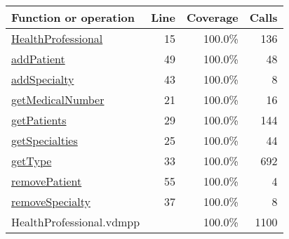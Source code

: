 \bigskip
\begin{longtable}{|l|r|r|r|}
\hline
Function or operation & Line & Coverage & Calls \\
\hline
\hline
\hyperref[HealthProfessional:15]{HealthProfessional} & 15&100.0\% & 136 \\
\hline
\hyperref[addPatient:49]{addPatient} & 49&100.0\% & 48 \\
\hline
\hyperref[addSpecialty:43]{addSpecialty} & 43&100.0\% & 8 \\
\hline
\hyperref[getMedicalNumber:21]{getMedicalNumber} & 21&100.0\% & 16 \\
\hline
\hyperref[getPatients:29]{getPatients} & 29&100.0\% & 144 \\
\hline
\hyperref[getSpecialties:25]{getSpecialties} & 25&100.0\% & 44 \\
\hline
\hyperref[getType:33]{getType} & 33&100.0\% & 692 \\
\hline
\hyperref[removePatient:55]{removePatient} & 55&100.0\% & 4 \\
\hline
\hyperref[removeSpecialty:37]{removeSpecialty} & 37&100.0\% & 8 \\
\hline
\hline
HealthProfessional.vdmpp & & 100.0\% & 1100 \\
\hline
\end{longtable}

